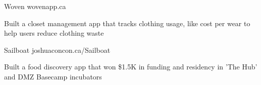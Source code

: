 \begin{cventries}
  \cventry
    {}
    {Woven}
    {}
    {wovenapp.ca}
    {}
    {
      \begin{cvitems}
        \item {Built a closet management app that tracks clothing usage, like cost per wear to help users reduce clothing waste}
      \end{cvitems}
    }
  \cventry
    {}
    {Sailboat}
    {}
    {joshuaconcon.ca/Sailboat}
    {}
    {
      \begin{cvitems}
        \item {Built a food discovery app that won \$1.5K in funding and residency in 'The Hub' and DMZ Basecamp incubators}
      \end{cvitems}
    }
\end{cventries}